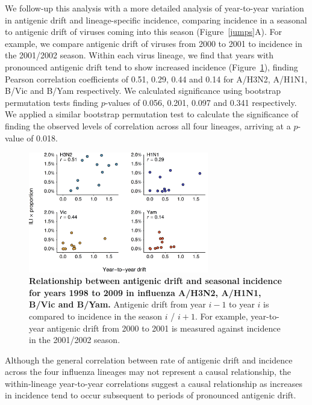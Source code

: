 \documentclass[11pt,oneside,letterpaper]{article}
\begin{document}
We follow-up this analysis with a more detailed analysis of year-to-year variation in antigenic drift and lineage-specific incidence, comparing incidence in a seasonal to antigenic drift of viruses coming into this season (Figure~\ref{jumps}A).
For example, we compare antigenic drift of viruses from 2000 to 2001 to incidence in the 2001/2002 season.
Within each virus lineage, we find that years with pronounced antigenic drift tend to show increased incidence (Figure~\ref{corr}), finding Pearson correlation coefficients of 0.51, 0.29, 0.44 and 0.14 for A/H3N2, A/H1N1, B/Vic and B/Yam respectively.
We calculated significance using bootstrap permutation tests finding $p$-values of 0.056, 0.201, 0.097 and 0.341 respectively.
We applied a similar bootstrap permutation test to calculate the significance of finding the observed levels of correlation across all four lineages, arriving at a $p$-value of 0.018.

\begin{figure}[h]
	\centering		
	\includegraphics[width=0.7\textwidth]{figures/corr}
	\caption{\textbf{Relationship between antigenic drift and seasonal incidence for years 1998 to 2009 in influenza A/H3N2, A/H1N1, B/Vic and B/Yam.}
	Antigenic drift from year $i-1$ to year $i$ is compared to incidence in the season $i$ / $i+1$.
	For example, year-to-year antigenic drift from 2000 to 2001 is measured against incidence in the 2001/2002 season. 
	} 
	\label{corr} 
\end{figure}

Although the general correlation between rate of antigenic drift and incidence across the four influenza lineages may not represent a causal relationship, the within-lineage year-to-year correlations suggest a causal relationship as increases in incidence tend to occur subsequent to periods of pronounced antigenic drift.

\end{document}
